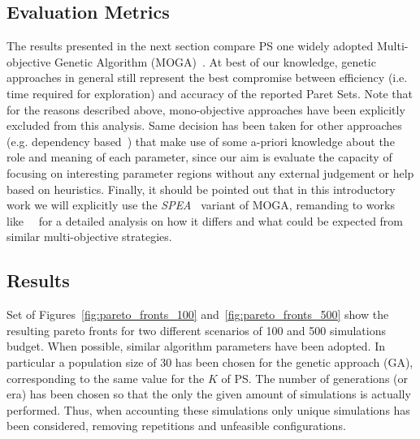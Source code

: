 \subsection{Evaluation Metrics}

The results presented in the next section compare PS one widely
adopted Multi-objective Genetic Algorithm
(MOGA)~\cite{knowles_techrep06}. At best of our knowledge, genetic
approaches in general still represent the best compromise between
efficiency (i.e. time required for exploration) and accuracy of the
reported Paret Sets.  Note that for the reasons described above,
mono-objective approaches have been explicitly excluded from this
analysis. Same decision has been taken for other approaches (e.g.
dependency based~\cite{givargis_tvlsi02}) that make use of some
a-priori knowledge about the role and meaning of each parameter, since
our aim is evaluate the capacity of focusing on interesting parameter
regions without any external judgement or help based on heuristics.
Finally, it should be pointed out that in this introductory work we
will explicitly use the \emph{SPEA}~\cite{zitzler_eurogen01} variant of MOGA,
remanding to works like~\cite{zitzler_ec00}~\cite{zitzler_tec03} for a
detailed analysis on how it differs and what could be expected from
similar multi-objective strategies.


\subsection{Results}

Set of Figures~\ref{fig:pareto_fronts_100}
and~\ref{fig:pareto_fronts_500} show the resulting pareto fronts for two
different scenarios of 100 and 500 simulations budget. When possible,
similar algorithm parameters have been adopted. In particular a
population size of 30 has been chosen for the genetic approach (GA), corresponding to the
same value for the $K$ of PS. The number of generations (or era)
has been chosen so that the only the given amount of simulations is
actually performed. Thus, when accounting these simulations only unique simulations
has been considered, removing repetitions and unfeasible
configurations.

